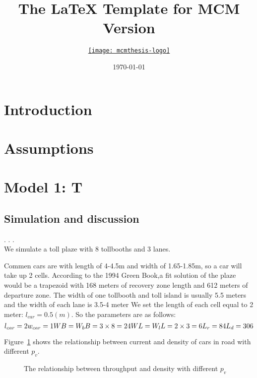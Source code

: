 \documentclass{mcmthesis}
\title{The \LaTeX{} Template for MCM Version \MCMversion}
\author{\small \href{http://www.latexstudio.net/}
  {\texttt{[image: mcmthesis-logo]}}}
\date{\today}
\begin{document}
\section{Introduction}
\section{Assumptions}
\section{Model 1: T}
\subsection{Simulation and discussion}
.
.
.
\\
We simulate a toll plaze with 8 tollbooths and 3 lanes.

Commen cars are with  length of 4-4.5m and width of 1.65-1.85m,
so a car will take up 2 cells.
According to the 1994 Green Book,a fit solution of
 the plaze would be a trapezoid with
168 meters of recovery zone length and 612 meters of departure zone.
The width of one tollbooth and toll island
is usually 5.5 meters and the width of each lane is 3.5-4 meter
We set the length of each cell equal to 2 meter: ${l}_{car}=0.5(m)$.
So the parameters are as follows:
\[
{l}_{car}=2\\
{w}_{car}=1\\
WB={W}_{b}B=3\times8=24\\
WL={W}_{l}L=2\times3=6\\
{L}_{r}=84\\
{L}_{d}=306\\
\]

Figure~\ref{fig:q-p} shows the relationship between current and density of cars in
road with different ${p}_{v}$. %

\begin{figure}[h]
\small
\centering
\caption{The relationship between throughput and density with different ${p}_{v}$}
 \label{fig:q-p}

\end{figure}
\end{document}
